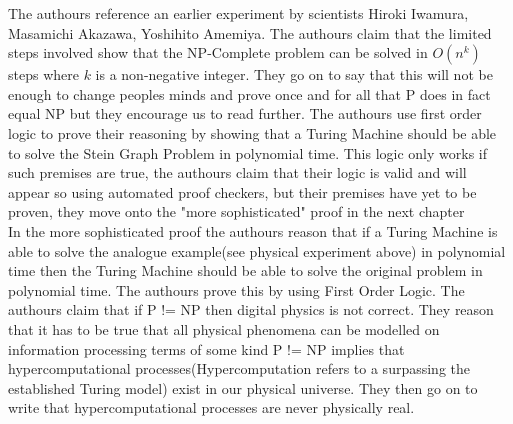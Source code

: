 \documentclass{report}
\begin{document}
The authours reference an earlier experiment by scientists Hiroki Iwamura, Masamichi Akazawa, Yoshihito Amemiya\cite{Iwamura}.  The authours claim that the limited steps involved show that the NP-Complete problem can be solved in $O(n^k)$ steps where $k$ is a non-negative integer.  They go on to say that this will not be enough to change peoples minds and prove once and for all that P does in fact equal NP but they encourage us to read further.  The authours use first order logic to prove their reasoning by showing that a Turing Machine should be able to solve the Stein Graph Problem\cite{Steiner} in polynomial time.  This logic only works if such premises are true, the authours claim that their logic is valid and will appear so using automated proof checkers, but their premises have yet to be proven, they move onto the "more sophisticated" proof in the next chapter\cite{PVsNPSolved}
\\
In the more sophisticated proof the authours reason that if a Turing Machine is able to solve the analogue example(see physical experiment above) in polynomial time then the Turing Machine should be able to solve the original problem in polynomial time.  The authours prove this by using First Order Logic\cite{Logic}.  The authours claim that if P != NP then digital physics\cite{Zuse} is not correct.  They reason that it has to be true that all physical phenomena can be modelled on information processing terms of some kind P != NP implies that hypercomputational processes(Hypercomputation refers to a surpassing the established Turing model)\cite{Wells_2004} exist in our physical universe.  They then go on to write that hypercomputational processes are never physically real.
\end{document}

